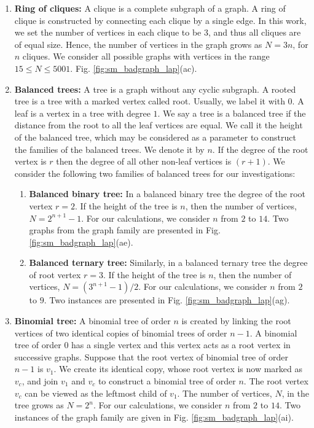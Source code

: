 \documentclass[%
 reprint,
 superscriptaddress,
 amsmath,amssymb,
 aps,
 pra,
floatfix,
nofootinbib,
]{revtex4-2}
\theoremstyle{definition}
\theoremstyle{remark}
\begin{document}
\begin{appendix}
\begin{enumerate}
		\item 
		\textbf{Ring of cliques:}
		A clique is a complete subgraph of a graph. A ring of clique is constructed by connecting each clique by a single edge. In this work, we set the number of vertices in each clique to be $3$, and thus all cliques are of equal size. Hence, the number of vertices in the graph grows as $N=3n$, for $n$ cliques. We consider all possible graphs with vertices in the range $15 \leq N \leq 5001$. Fig. \ref{fig:sm_badgraph_lap}(ac). 
		
		\item 
		\textbf{Balanced trees:}
		A tree is a graph without any cyclic subgraph. A rooted tree is a tree with a marked vertex called root. Usually, we label it with $0$. A leaf is a vertex in a tree with degree $1$. We say a tree is a balanced tree if the distance from the root to all the leaf vertices are equal. We call it the height of the balanced tree, which may be considered as a parameter to construct the families of the balanced trees. We denote it by $n$. If the degree of the root vertex is $r$ then the degree of all other non-leaf vertices is $(r + 1)$. We consider the following two families of balanced trees for our investigations: 
		\begin{enumerate}
			\item 
			\textbf{Balanced binary tree:} 
			In a balanced binary tree the degree of the root vertex $r = 2$. If the height of the tree is $n$, then the number of vertices, $N = 2^{n+1}-1$. For our calculations, we consider $n$ from $2$ to $14$. Two graphs from the graph family are presented in Fig. \ref{fig:sm_badgraph_lap}(ae).
			
			\item 
			\textbf{Balanced ternary tree:}
			Similarly, in a balanced ternary tree the degree of root vertex $r = 3$. If the height of the tree is $n$, then the number of vertices, $N = (3^{n+1} - 1)/2$. For our calculations, we consider $n$ from $2$ to $9$. Two instances are presented in Fig. \ref{fig:sm_badgraph_lap}(ag).
		\end{enumerate}
		\item 
		\textbf{Binomial tree:}
		A binomial tree of order $n$ is created by linking the root vertices of two identical copies of binomial trees of order $n-1$. A binomial tree of order $0$ has a single vertex and this vertex acts as a root vertex in successive graphs. Suppose that the root vertex of binomial tree of order $n-1$ is $v_1$. We create its identical copy, whose root vertex is now marked as $v_c$, and join $v_1$ and $v_c$ to construct a binomial tree of order $n$. The root vertex $v_c$ can be viewed as the leftmost child of $v_1$. The number of vertices, $N$, in the tree grows as $N=2^n$. For our calculations, we consider $n$ from $2$ to $14$. Two instances of the graph family are given in Fig. \ref{fig:sm_badgraph_lap}(ai).
	\end{enumerate}
	

\end{appendix}
\end{document}
